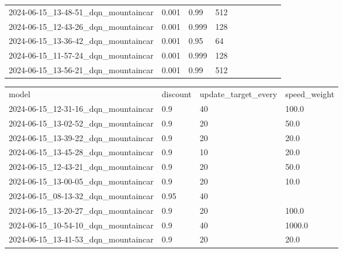\documentclass[a4paper,12pt]{article}
\begin{document}
\begin{center}
{\begin{tabular}{llllllllll}
            2024-06-15\_13-48-51\_dqn\_mountaincar & 0.001        & 0.99           & 512         \\
            2024-06-15\_12-43-26\_dqn\_mountaincar & 0.001        & 0.999          & 128         \\
            2024-06-15\_13-36-42\_dqn\_mountaincar & 0.001        & 0.95           & 64          \\
            2024-06-15\_11-57-24\_dqn\_mountaincar & 0.001        & 0.999          & 128         \\
            2024-06-15\_13-56-21\_dqn\_mountaincar & 0.001        & 0.99           & 512         \\
        \end{tabular}
    }
\end{center}

\begin{center}
    \resizebox{\textwidth}{!} {
        \begin{tabular}{llll}
            model                                  & discount & update\_target\_every & speed\_weight \\
            2024-06-15\_12-31-16\_dqn\_mountaincar & 0.9      & 40                    & 100.0         \\
            2024-06-15\_13-02-52\_dqn\_mountaincar & 0.9      & 20                    & 50.0          \\
            2024-06-15\_13-39-22\_dqn\_mountaincar & 0.9      & 20                    & 20.0          \\
            2024-06-15\_13-45-28\_dqn\_mountaincar & 0.9      & 10                    & 20.0          \\
            2024-06-15\_12-43-21\_dqn\_mountaincar & 0.9      & 20                    & 50.0          \\
            2024-06-15\_13-00-05\_dqn\_mountaincar & 0.9      & 20                    & 10.0          \\
            2024-06-15\_08-13-32\_dqn\_mountaincar & 0.95     & 40                    &               \\
            2024-06-15\_13-20-27\_dqn\_mountaincar & 0.9      & 20                    & 100.0         \\
            2024-06-15\_10-54-10\_dqn\_mountaincar & 0.9      & 40                    & 1000.0        \\
            2024-06-15\_13-41-53\_dqn\_mountaincar & 0.9      & 20                    & 20.0          \\

\end{tabular}}
\end{center}
\end{document}
